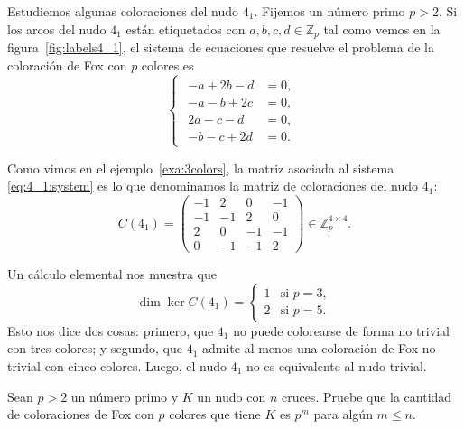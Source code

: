 \documentclass[graybox]{svmult}
\newcommand{\Z}{\mathbb{Z}}
\begin{document}
\begin{example}
	\label{exa:4_1:colorings}
    Estudiemos algunas coloraciones del nudo $4_1$. Fijemos un número primo $p>2$.
    Si los arcos del nudo $4_1$ están etiquetados con
    $a,b,c,d\in\Z_p$ tal como vemos en la figura~\ref{fig:labels4_1}, el
    sistema de ecuaciones que resuelve el problema de la coloración de Fox con $p$
    colores es
    \begin{equation}
        \begin{cases}
            \begin{aligned}
                \label{eq:4_1:system}
                -a+2b-d&=0,\\
                -a-b+2c&=0,\\
                2a-c-d&=0,\\
                -b-c+2d&=0.
            \end{aligned}
        \end{cases}
    \end{equation}

	Como vimos en el ejemplo~\ref{exa:3colors}, la
	matriz asociada al sistema \eqref{eq:4_1:system} es lo que denominamos la
	matriz de coloraciones del nudo $4_1$:
	\begin{equation*}
		\label{eq:4_1:matrix}
		C(4_1)=\begin{pmatrix}
			-1 &  2 &  0 & -1\\
			-1 & -1 &  2 &  0\\
			2 &  0 & -1 & -1\\
			0 & -1 & -1 &  2
		\end{pmatrix}\in\Z_p^{4\times4}.
	\end{equation*}

	Un cálculo elemental nos muestra que 
	\[
	\dim\ker C(4_1)=\begin{cases}
		1 & \text{si $p=3$},\\
		2 & \text{si $p=5$}.
	\end{cases}
	\]
    Esto nos dice dos cosas: primero, que $4_1$ no puede colorearse de forma no
    trivial con tres colores; y segundo, que $4_1$ admite al menos una coloración
    de Fox no trivial con cinco colores. Luego, el nudo $4_1$ no es equivalente
    al nudo trivial. 
\end{example}

 \begin{exercise}
     Sean $p>2$ un número primo y $K$ un nudo con $n$ cruces. Pruebe que la
     cantidad de coloraciones de Fox con $p$ colores que tiene $K$ es $p^m$ para
     algún $m\leq n$.
 \end{exercise}
\end{document}
